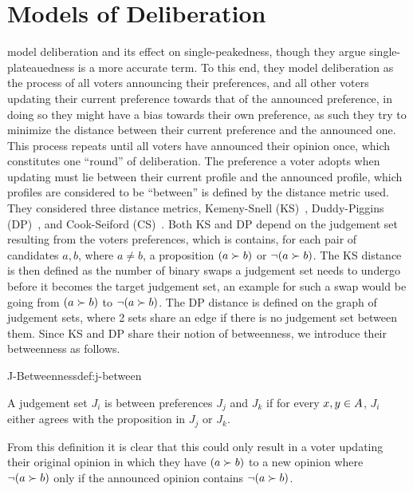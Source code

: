 \section{Models of Deliberation} \label{section:related_work} %
\citet{radDeliberationSinglePeakednessCoherent2021} model deliberation and its
effect on single-peakedness, though they argue single-plateauedness is a more
accurate term. To this end, they model deliberation as the process of all
voters announcing their preferences, and all other voters updating their
current preference towards that of the announced preference, in doing so they
might have a bias towards their own preference, as such they try to minimize
the distance between their current preference and the announced one. This
process repeats until all voters have announced their opinion once, which
constitutes one ``round'' of deliberation. The preference a voter adopts when
updating must lie between their current profile and the announced profile,
which profiles are considered to be ``between'' is defined by the distance
metric used. They considered three distance metrics, Kemeny-Snell
(KS)~\citep{kemeny1962preference}, Duddy-Piggins
(DP)~\citep{duddyMeasureDistanceJudgment2012}, and Cook-Seiford
(CS)~\citep{cookPriorityRankingConsensus1978}. Both KS and DP depend on the
judgement set resulting from the voters preferences, which is contains, for
each pair of candidates $a,b$, where $a \neq b$, a proposition $(a \succ b)$ or $\neg (a
	\succ b)$. The KS distance is then defined as the number of binary swaps a
judgement set needs to undergo before it becomes the target judgement set, an
example for such a swap would be going from $(a \succ b)$ to $\neg (a \succ
	b)$. The DP distance is defined on the graph of judgement sets, where 2 sets
share an edge if there is no judgement set between them. Since KS and DP share
their notion of betweenness, we introduce their betweenness as follows.

\begin{definition}{J-Betweenness}{def:j-between}

	A judgement set $J_i$ is between preferences $J_j$ and $J_k$ if for
	every $x,y \in A$, $J_i$ either agrees with the proposition
	in $J_j$ or $J_k$.

\end{definition}

From this definition it is clear that this could only result in a voter
updating their original opinion in which they have $(a \succ b)$ to a new
opinion where $\neg (a\succ b)$ only if the announced opinion contains $\neg (a
	\succ b)$.

